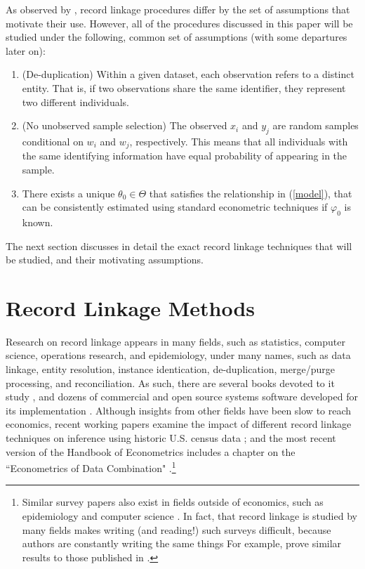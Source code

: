 \documentclass[12pt]{article}
\begin{document}
As observed by \cite{bailey2017}, record linkage procedures differ by the set of assumptions that motivate their use.  However, all of the procedures discussed in this paper will be studied under the following, common set of assumptions (with some departures later on):
\begin{enumerate}
\item (De-duplication) Within a given dataset, each observation refers to a distinct entity.  That is, if two observations share the same identifier, they represent two different individuals.
\item (No unobserved sample selection) The observed $x_i$ and $y_j$ are random samples conditional on $w_i$ and $w_j$, respectively.  This means that all individuals with the same identifying information have equal probability of appearing in the sample. 
\item There exists a unique $\theta_0 \in \Theta$ that satisfies the relationship in (\ref{model}), that can be consistently estimated using standard econometric techniques if $\varphi_0$ is known.
\end{enumerate}

The next section discusses in detail the exact record linkage techniques that will be studied, and their motivating assumptions.

\section{Record Linkage Methods}

Research on record linkage appears in many fields, such as statistics, computer science, operations research, and epidemiology, under many names, such as data linkage, entity resolution, instance identication, de-duplication, merge/purge processing, and reconciliation.  As such, there are several books devoted to it study \citep{harron_book, christen2012, herzog07}, and dozens of commercial and open source systems software developed for its implementation \citep{kopcke2010}.  Although insights from other fields have been slow to reach economics, recent working papers examine the impact of different record linkage techniques on inference using historic U.S. census data \citep{abe2019, bailey2017}; and the most recent version of the Handbook of Econometrics includes a chapter on the ``Econometrics of Data Combination" \citep{RidderMoffitt}.\footnote{Similar survey papers also exist in fields outside of economics, such as epidemiology and computer science \citep{harron2018, winkler99}.  In fact, that record linkage is studied by many fields makes writing (and reading!) such surveys difficult, because authors are constantly writing the same things For example, \cite{Goldstein2012} prove similar results to those published in \cite{hirukawa2018}.}
\end{document}
